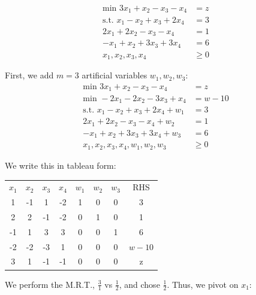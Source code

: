 \documentclass{article}
\begin{document}
\begin{eg}
    \begin{align}
        \text{min }3x_1+x_2-x_3-x_4 &=z \\
        \text{s.t. }x_1-x_2+x_3+2x_4 &=3 \\
        2x_1+2x_2-x_3-x_4 &=1 \\
        -x_1+x_2+3x_3+3x_4 &=6 \\
        x_1, x_2, x_3, x_4 &\geq 0
    \end{align}
\end{eg}
\begin{answer}
    First, we add \(m=3\) artificial variables \(w_1, w_2, w_3\): \\
    \begin{align}
        \text{min }3x_1+x_2-x_3-x_4 &=z \\
        \text{min }-2x_1-2x_2-3x_3+x_4 &=w-10 \\
        \text{s.t. }x_1-x_2+x_3+2x_4 +w_1 &=3 \\
        2x_1+2x_2-x_3-x_4 +w_2&=1 \\
        -x_1+x_2+3x_3+3x_4 +w_3&=6 \\
        x_1, x_2, x_3, x_4, w_1, w_2, w_3 &\geq 0
    \end{align}

    We write this in tableau form: \\
    \begin{tabular}{c c c c c c c | c }
        \(x_1\) & \(x_2\) & \(x_3\) & \(x_4\) & \(w_1\) & \(w_2\) & \(w_3\) & RHS \\
        1 & -1 & 1 & -2 & 1 & 0 & 0 & 3 \\
        2 & 2 & -1 & -2 & 0 & 1 & 0 & 1 \\
        -1 & 1 & 3 & 3 & 0 & 0 & 1 & 6 \\
        \hline
        -2 & -2 & -3 & 1 & 0 & 0 & 0 & \(w-10\) \\
        3 & 1 & -1 & -1 & 0 & 0 & 0 & z
    \end{tabular}

    We perform the M.R.T., \(\frac{3}{1}\) vs \(\frac{1}{2}\), and chose \(\frac{1}{2}\). Thus, we pivot on \(x_1\): \\
    


\end{answer}
\end{document}
